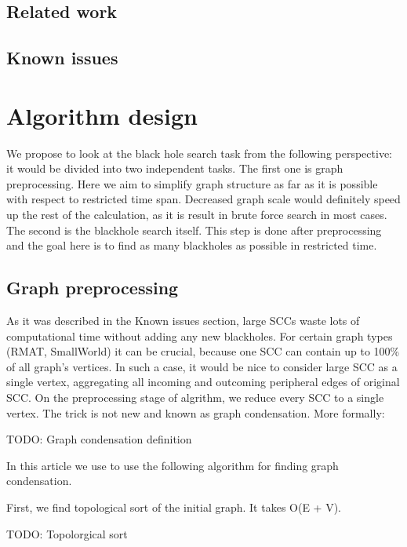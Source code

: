 \documentclass{svproc}
\begin{document}
%
\subsection{Related work}
%

%
\subsection{Known issues}
%

%
\section{Algorithm design}
We propose to look at the black hole search task from the following perspective: it would be divided into two independent 
tasks. 
The first one is graph preprocessing. Here we aim to simplify graph structure as far as it is possible with respect to
restricted time span. Decreased graph scale would definitely speed up the rest of the calculation, as it is result in brute force search in most cases.
The second is the blackhole search itself. This step is done after preprocessing and the goal here is to find as many blackholes as possible in restricted time.
%

%
\subsection{Graph preprocessing}
As it was described in the Known issues section, large SCCs waste lots of computational time without adding any new blackholes.
For certain graph types (RMAT, SmallWorld) it can be crucial, because one SCC can contain up to 100\% of all graph's vertices. 
In such a case, it would be nice to consider large SCC as a single vertex, aggregating all incoming and outcoming peripheral edges
of original SCC.
On the preprocessing stage of algrithm, we reduce every SCC to a single vertex. The trick is not new and known as graph condensation.
More formally:\par
\begin{definition}
TODO: Graph condensation definition
\end{definition}

In this article we use to use the following algorithm for finding graph condensation.\par

First, we find topological sort of the initial graph. It takes O(E + V).
\begin{definition}
TODO: Topolorgical sort
\end{definition}
\end{document}
